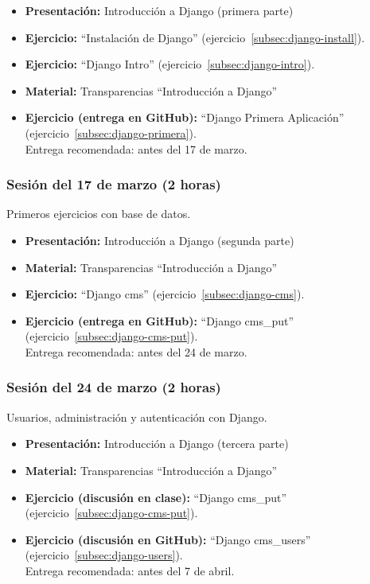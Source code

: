 \documentclass[a4paper,12pt]{article}
\begin{document}
\begin{itemize}
 \item \textbf{Presentación:} Introducción a Django (primera parte)
 \item \textbf{Ejercicio:} ``Instalación de Django'' (ejercicio~\ref{subsec:django-install}).
 \item \textbf{Ejercicio:} ``Django Intro'' (ejercicio~\ref{subsec:django-intro}).
 \item \textbf{Material:} Transparencias ``Introducción a Django''
 \item \textbf{Ejercicio (entrega en GitHub):} ``Django Primera Aplicación'' (ejercicio~\ref{subsec:django-primera}). \\
    Entrega recomendada: antes del 17 de marzo.
\end{itemize}

\subsubsection{Sesión del 17 de marzo (2 horas)}

Primeros ejercicios con base de datos.

\begin{itemize}
 \item \textbf{Presentación:} Introducción a Django (segunda parte)
 \item \textbf{Material:} Transparencias ``Introducción a Django''

 \item \textbf{Ejercicio:} ``Django cms'' (ejercicio~\ref{subsec:django-cms}).
 \item \textbf{Ejercicio (entrega en GitHub):} ``Django cms\_put'' (ejercicio~\ref{subsec:django-cms-put}).\\
    Entrega recomendada: antes del 24 de marzo.
 
\end{itemize}

\subsubsection{Sesión del 24 de marzo (2 horas)}

Usuarios, administración y autenticación con Django.

\begin{itemize}
 \item \textbf{Presentación:} Introducción a Django (tercera parte)
 \item \textbf{Material:} Transparencias ``Introducción a Django''
  \item \textbf{Ejercicio (discusión en clase):} ``Django cms\_put'' (ejercicio~\ref{subsec:django-cms-put}).
 \item \textbf{Ejercicio (discusión en GitHub):} ``Django cms\_users'' (ejercicio~\ref{subsec:django-users}). \\
 Entrega recomendada: antes del 7 de abril.
\end{itemize}
\end{document}
